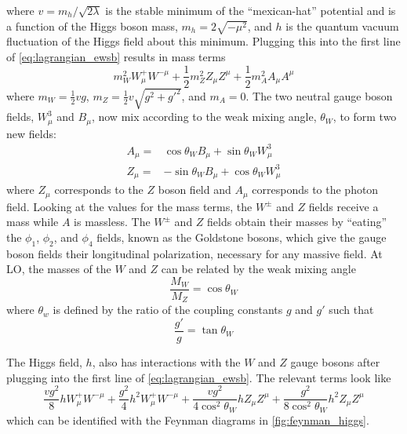 where $v=m_h /\sqrt{2 \lambda}$ is the stable minimum of the 
``mexican-hat'' potential and is a function of the Higgs boson 
mass, $m_h = 2 \sqrt{- \mu^2}$, and $h$ is the quantum 
vacuum fluctuation of the Higgs field about this minimum.
Plugging this into the first line of \eqn\eqref{eq:lagrangian_ewsb}
results in mass terms
\begin{equation}
m_W^2 W_{\mu}^+ W^{-\mu} + \frac{1}{2}m_Z^2 Z_{\mu} Z^{\mu} + \frac{1}{2} m_A^2 A_{\mu} A^{\mu}
\end{equation}
where $m_W = \frac{1}{2} vg$, $m_Z=\frac{1}{2} v\sqrt{g^2+g'^2}$, and 
$m_A=0$.
The two neutral gauge boson fields, $W_{\mu}^3$ and $B_{\mu}$, 
now mix according to the weak mixing angle, $\theta_W$, to form two new fields:
\begin{align}
A_{\mu} =& \cos\theta_W B_{\mu} + \sin\theta_W W_{\mu}^3 \\
Z_{\mu} =& -\sin\theta_W B_{\mu} + \cos\theta_W W_{\mu}^3
\end{align}
where $Z_{\mu}$ corresponds to the $Z$ boson field
and $A_{\mu}$ corresponds to the photon field.
Looking at the values for the mass terms, the $W^{\pm}$ and $Z$ fields
receive a mass while $A$ is massless.
The $W^{\pm}$ and $Z$ fields obtain their masses by ``eating''
the $\phi_1$, $\phi_2$, and $\phi_4$ fields, known as the Goldstone
bosons, which give the gauge boson fields their longitudinal polarization,
necessary for any massive field.
At LO, the masses of the $W$ and $Z$ can be related by the weak mixing angle
\begin{equation}
\frac{M_W}{M_Z} = \cos \theta_W
\end{equation}
where $\theta_w$ is defined by the ratio of the coupling constants
$g$ and $g'$ such that
\begin{equation}
\frac{g'}{g} = \tan\theta_W
\end{equation}



The Higgs field, $h$, also 
has interactions with the $W$ and $Z$ gauge bosons
after plugging into the first line of \eqn\eqref{eq:lagrangian_ewsb}.
The relevant terms look like
\begin{equation}
\frac{vg^2}{8} h W^+_{\mu}W^{-\mu} + \frac{g^2}{4} h^2W^{+}_{\mu}W^{-\mu}
+\frac{vg^2}{4 \cos^2\theta_W} h Z_{\mu} Z^{\mu} 
+\frac{g^2}{8\cos^2\theta_W} h^2 Z_{\mu}Z^{\mu}
\end{equation}
which can be identified with the Feynman diagrams in \fig\ref{fig:feynman_higgs}.

